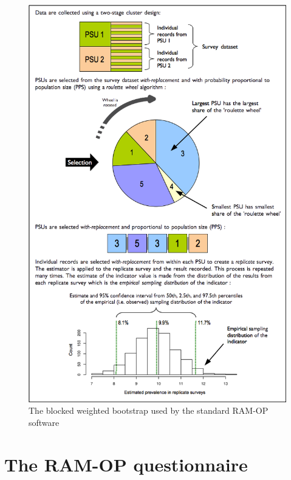 \documentclass[12pt,a4paper]{book}
\theoremstyle{definition}
\theoremstyle{definition}
\theoremstyle{definition}
\theoremstyle{remark}
\begin{document}
\begin{figure}[H]

{\centering \includegraphics{figures/bbw} 

}

\caption{The blocked weighted bootstrap used by the standard RAM-OP software}\label{fig:indicators31}
\end{figure}

\hypertarget{questionnaire}{%
\chapter{The RAM-OP questionnaire}\label{questionnaire}}
\end{document}
